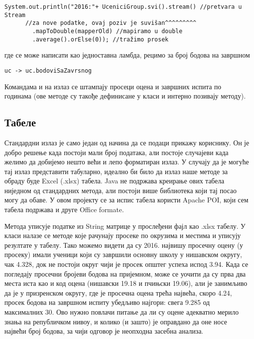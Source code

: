 \pagebreak %
\begin{verbatim}
System.out.println("2016:"+ UceniciGroup.svi().stream() //pretvara u Stream
      //za nove podatke, ovaj poziv je suvišan^^^^^^^^^
        .mapToDouble(mapperOld) //mapiramo u double
        .average().orElse(0)); //tražimo prosek
\end{verbatim}
где се  може написати као једноставна ламбда, рецимо за број бодова на завршном
\begin{verbatim}
uc -> uc.bodoviSaZavrsnog
\end{verbatim}
Командама  и  на излаз се штампају просеци оцена и завршних испита по годинама (ове методе су такође дефинисане у класи  и интерно позивају  методу).

\subsection{Табеле}\label{subs:spreadsheets}

Стандардни излаз је само један од начина да се подаци прикажу кориснику. Он је добро решење када постоји мали број података, али постоје случајеви када желимо да добијемо нешто већи и лепо форматиран излаз. У случају да је могуће тај излаз представити табуларно, идеално би било да излаз наше методе за обраду буде Excel (.xlsx) табела. Java не подржава креирање ових табела ниједном од стандардних метода, али постоји више библиотека који тај посао могу да обаве. У овом пројекту се за испис табела користи Apache POI, који сем табела подржава и друге Office formate.

Метода  уписује податке из String матрице у прослеђени фајл као .xlsx табелу. У класи  налазе се методе које рачунају просеке по окрузима и местима и уписују резултате у табелу. Тако можемо видети да су 2016. највишу просечну оцену (у просеку) имали ученици који су завршили основну школу у нишавском округу, чак 4.328, док не постоји округ чији је просек општег успеха испод 3.94. Када се погледају просечни бројеви бодова на пријемном, може се уочити да су прва два места иста као и код оцена (нишавски 19.18 и пчињски 19.06), али је занимљиво да је у призренском округу, где је просечна оцена трећа највећа, скоро 4.24, просек бодова на завршном испиту убедљиво најгори: свега 9.285 од максималних 30. Ово нужно повлачи питање да ли су оцене адекватно мерило знања на републичком нивоу, и колико (и зашто) је оправдано да оне носе највећи број бодова, за чији одговор је неопходна засебна анализа.

